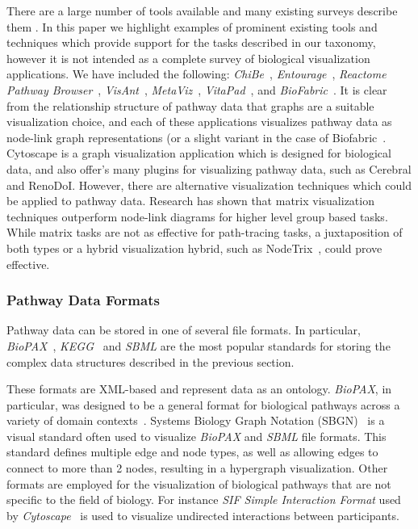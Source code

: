 There are a large number of tools available and many existing surveys describe them \cite{Suderman2007tools,pavlopoulos2008survey,Gehlenborg2010omics}.
In this paper we highlight examples of prominent existing tools and techniques which provide support for the tasks described in our taxonomy, however it is not intended as a complete survey of biological visualization applications.
We have included the following: \textit{ChiBe}~\cite{Babur2010chibe}, \textit{Entourage}~\cite{Lex2013entourage}, \textit{Reactome Pathway Browser}~\cite{croft2014reactome}, \textit{VisAnt}~\cite{hu2004visant}, \textit{MetaViz}~\cite{bourqui2007metabolic}, \textit{VitaPad}~\cite{holford2005vitapad}, and \textit{BioFabric}~\cite{Longabaugh2012biofabric}.
It is clear from the relationship structure of pathway data that graphs are a suitable visualization choice, and each of these applications visualizes pathway data as node-link graph representations (or a slight variant in the case of Biofabric~\cite{Longabaugh2012biofabric}.
Cytoscape \cite{cytoscape} is a graph visualization application which is designed for biological data, and also offer’s many plugins for visualizing pathway data, such as Cerebral\cite{Barsky2008cerebral} and RenoDoI\cite{Vehlow2015}.
However, there are alternative visualization techniques which could be applied to pathway data.
Research has shown that matrix visualization techniques outperform node-link diagrams for higher level group based tasks\cite{Ghoniem2004,Henry2007}.
While matrix tasks are not as effective for path-tracing tasks, a juxtaposition of both types or a hybrid visualization hybrid, such as NodeTrix~\cite{NodeTrix2007}, could prove effective.




\subsubsection{Pathway Data Formats}
Pathway data can be stored in one of several file formats.
In particular, \textit{BioPAX}~\cite{demir2010biopax}, \textit{KEGG}~\cite{kanehisa2000kegg} and \textit{SBML} \cite{Hucka2003} are the most popular standards for storing the complex data structures described in the previous section.

These formats are XML-based and represent data as an ontology.
\emph{BioPAX}, in particular, was designed to be a general format for biological pathways across a variety of domain contexts~\cite{demir2010biopax}.
Systems Biology Graph Notation (SBGN)~\cite{Novere2009} is a visual standard often used to visualize \textit{BioPAX} and \textit{SBML} file formats.
This standard defines multiple edge and node types, as well as allowing edges to connect to more than 2 nodes, resulting in a hypergraph visualization.
Other formats are employed for the visualization of biological pathways that are not specific to the field of biology.
For instance \textit{SIF Simple Interaction Format} used by \textit{Cytoscape}~\cite{Shannon2003cytoscape} is used to visualize undirected interactions between participants.

